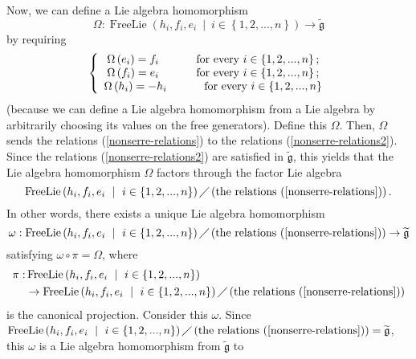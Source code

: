 \documentclass[etingof-lie.tex]{subfiles}
\begin{document}
\begin{verlong}
Now, we can define a Lie algebra homomorphism
\[
\Omega:\operatorname*{FreeLie}\left(  h_{i},f_{i},e_{i}\ \mid\ i\in\left\{
1,2,...,n\right\}  \right)  \rightarrow\widetilde{\mathfrak{g}}%
\]
by requiring%
\begin{equation}
\left\{
\begin{array}
[c]{c}%
\Omega\left(  e_{i}\right)  =f_{i}\ \ \ \ \ \ \ \ \ \ \text{for every }%
i\in\left\{  1,2,...,n\right\}  ;\\
\Omega\left(  f_{i}\right)  =e_{i}\ \ \ \ \ \ \ \ \ \ \text{for every }%
i\in\left\{  1,2,...,n\right\}  ;\\
\Omega\left(  h_{i}\right)  =-h_{i}\ \ \ \ \ \ \ \ \ \ \text{for every }%
i\in\left\{  1,2,...,n\right\}
\end{array}
\right.  \label{pf.gtilde.OMEGA}%
\end{equation}
(because we can define a Lie algebra homomorphism from a Lie algebra by
arbitrarily choosing its values on the free generators). Define this $\Omega$.
Then, $\Omega$ sends the relations (\ref{nonserre-relations}) to the relations
(\ref{nonserre-relations2}). Since the relations (\ref{nonserre-relations2})
are satisfied in $\widetilde{\mathfrak{g}}$, this yields that the Lie algebra
homomorphism $\Omega$ factors through the factor Lie algebra%
\[
\operatorname*{FreeLie}\left(  h_{i},f_{i},e_{i}\ \mid\ i\in\left\{
1,2,...,n\right\}  \right)  \diagup\left(  \text{the relations
(\ref{nonserre-relations})}\right)  .
\]
In other words, there exists a unique Lie algebra homomorphism%
\[
\omega:\operatorname*{FreeLie}\left(  h_{i},f_{i},e_{i}\ \mid\ i\in\left\{
1,2,...,n\right\}  \right)  \diagup\left(  \text{the relations
(\ref{nonserre-relations})}\right)  \rightarrow\widetilde{\mathfrak{g}}%
\]
satisfying $\omega\circ\pi=\Omega$, where
\begin{align*}
\pi:  &  \operatorname*{FreeLie}\left(  h_{i},f_{i},e_{i}\ \mid\ i\in\left\{
1,2,...,n\right\}  \right) \\
&  \rightarrow\operatorname*{FreeLie}\left(  h_{i},f_{i},e_{i}\ \mid
\ i\in\left\{  1,2,...,n\right\}  \right)  \diagup\left(  \text{the relations
(\ref{nonserre-relations})}\right)
\end{align*}
is the canonical projection. Consider this $\omega$. Since \newline%
$\operatorname*{FreeLie}\left(  h_{i},f_{i},e_{i}\ \mid\ i\in\left\{
1,2,...,n\right\}  \right)  \diagup\left(  \text{the relations
(\ref{nonserre-relations})}\right)  =\widetilde{\mathfrak{g}}$, this $\omega$
is a Lie algebra homomorphism from $\widetilde{\mathfrak{g}}$ to

\end{verlong}
\end{document}
